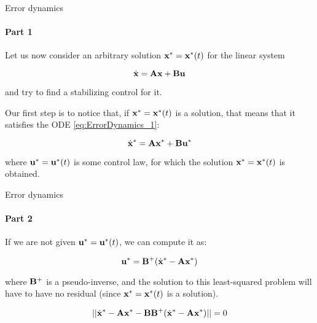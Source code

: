 \documentclass{beamer}
\begin{document}
\begin{frame}{Error dynamics}
\framesubtitle{Part 1}
\begin{flushleft}

Let us now consider an arbitrary solution $\mathbf{x}^* = \mathbf{x}^*(t)$ for the linear system

\begin{equation}
\label{eq:ErrorDynamics_1}
    \dot{\mathbf{x}} = \mathbf{A}\mathbf{x} + \mathbf{B}\mathbf{u}
\end{equation}

and try to find a stabilizing control for it.

\bigskip

Our first step is to notice that, if $\mathbf{x}^* = \mathbf{x}^*(t)$ is a solution, that means that it satisfies the ODE \eqref{eq:ErrorDynamics_1}:

\begin{equation}
    \dot{\mathbf{x}}^* = \mathbf{A}\mathbf{x}^* + \mathbf{B}\mathbf{u}^*
\end{equation}

where $\mathbf{u}^* = \mathbf{u}^*(t)$ is some control law, for which the solution $\mathbf{x}^* = \mathbf{x}^*(t)$ is obtained. 

\end{flushleft}
\end{frame}



\begin{frame}{Error dynamics}
\framesubtitle{Part 2}
\begin{flushleft}

 If we are not given $\mathbf{u}^* = \mathbf{u}^*(t)$, we can compute it as:

\begin{equation}
    \mathbf{u}^* = \mathbf{B}^+(\dot{\mathbf{x}}^* - \mathbf{A}\mathbf{x}^*)
\end{equation}

where $\mathbf{B}^+$ is a pseudo-inverse, and the solution to this least-squared problem will have to have no residual (since $\mathbf{x}^* = \mathbf{x}^*(t)$ is a solution).

\begin{equation}
   || \dot{\mathbf{x}}^* - \mathbf{A}\mathbf{x}^* - \mathbf{B}\mathbf{B}^+(\dot{\mathbf{x}}^* - \mathbf{A}\mathbf{x}^*) || = 0
\end{equation}

\end{flushleft}
\end{frame}
\end{document}
